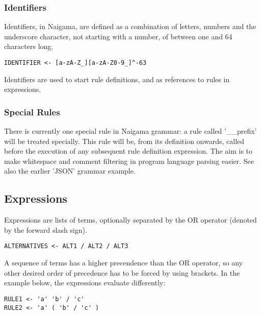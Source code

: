 \subsubsection{Identifiers}

Identifiers, in Naigama, are defined as a combination of letters,
numbers and the underscore character, not starting with a number,
of between one and 64 characters long.

\begin{myquote}
\begin{verbatim}
IDENTIFIER <- [a-zA-Z_][a-zA-Z0-9_]^-63
\end{verbatim}
\end{myquote}

Identifiers are used to start rule definitions, and as references
to rules in expressions.

\subsubsection{Special Rules}

There is currently one special rule in Naigama grammar: a rule called
'\_\_prefix' will be treated specially. This rule will be, from its
definition onwards, called before the execution of any subsequent rule
definition expression. The aim is to make whitespace and comment filtering
in program language parsing easier. See also the earlier 'JSON' grammar
example.

\subsection{Expressions}

Expressions are lists of terms, optionally separated by the
OR operator (denoted by the forward slash sign).

\begin{myquote}
\begin{verbatim}
ALTERNATIVES <- ALT1 / ALT2 / ALT3
\end{verbatim}
\end{myquote}

A sequence of terms has a higher precendence than the OR operator,
so any other desired order of precedence has to be forced by using
brackets.
In the example below, the expressions evaluate differently:

\begin{myquote}
\begin{verbatim}
RULE1 <- 'a' 'b' / 'c'
RULE2 <- 'a' ( 'b' / 'c' )
\end{verbatim}
\end{myquote}

